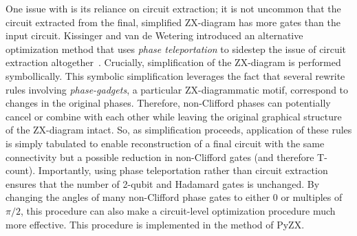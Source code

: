 One issue with  is its reliance on circuit extraction; it is not uncommon that the circuit extracted from the final, simplified ZX-diagram has more gates than the input circuit.
Kissinger and van de Wetering introduced an alternative optimization method that uses \emph{phase teleportation} to sidestep the issue of circuit extraction altogether~\cite{kissinger2019reducing}.
Crucially, simplification of the ZX-diagram is performed symbollically.
This symbolic simplification leverages the fact that several rewrite rules involving \emph{phase-gadgets}, a particular ZX-diagrammatic motif, correspond to changes in the original phases.
Therefore, non-Clifford phases can potentially cancel or combine with each other while leaving the original graphical structure of the ZX-diagram intact.
So, as simplification proceeds, application of these rules is simply tabulated to enable reconstruction of a final circuit with the same connectivity but a possible reduction in non-Clifford gates (and therefore T-count).
Importantly, using phase teleportation rather than circuit extraction ensures that the number of 2-qubit and Hadamard gates is unchanged. %
By changing the angles of many non-Clifford phase gates to either 0 or multiples of $\pi /2$, this procedure can also make a circuit-level optimization procedure much more effective.
This procedure is implemented in the  method of PyZX.
